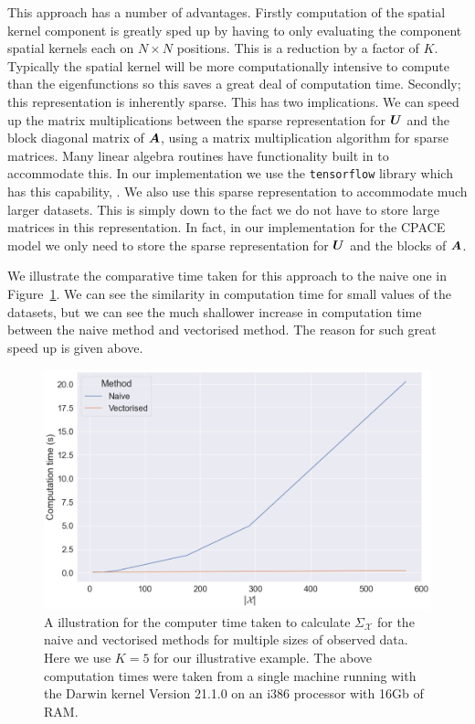 This approach has a number of advantages.
Firstly computation of the spatial kernel component is greatly sped up by having to only evaluating the component spatial kernels each on $N \times N$ positions.
This is a reduction by a factor of $K$.
Typically the spatial kernel will be more computationally intensive to compute than the eigenfunctions so this saves a great deal of computation time.
Secondly; this representation is inherently sparse.
This has two implications.
We can speed up the matrix multiplications between the sparse representation for $\bm{{U}}$ and the block diagonal matrix of $\bm{{A}}$, using a matrix multiplication algorithm for sparse matrices. 
Many linear algebra routines have functionality built in to accommodate this.
In our implementation we use the \verb*|tensorflow| library which has this capability, \citep{abadi_tensorflow_2016}.
We also use this sparse representation to accommodate much larger datasets.
This is simply down to the fact we do not have to store large matrices in this representation.
In fact, in our implementation for the CPACE model we only need to store the sparse representation for $\bm{{U}}$ and the blocks of $\bm{{A}}$. 

We illustrate the comparative time taken for this approach to the naive one in Figure~\ref{fig:imp_utau}.
We can see the similarity in computation time for small values of the datasets, but we can see the much shallower increase in computation time between the naive method and vectorised method.
The reason for such great speed up is given above.
\begin{figure}
	\centering
	\includegraphics[width=\textwidth]{imp_utau}
	\caption{A illustration for the computer time taken to calculate $\Sigma_\mathcal{X}$ for the naive and vectorised methods for multiple sizes of observed data. Here we use $K = 5$ for our illustrative example. The above computation times were taken from a single machine running with the Darwin kernel Version 21.1.0 on an i386 processor with 16Gb of RAM.}
	\label{fig:imp_utau}
\end{figure}


